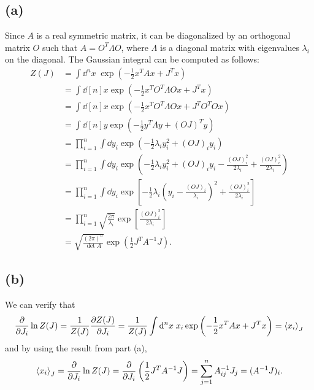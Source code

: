 \documentclass{article}
\begin{document}
\subsection*{(a)}
Since $A$ is a real symmetric matrix, it can be diagonalized by an orthogonal matrix $O$ such that $A=O^T \Lambda O$, where $\Lambda$ is a diagonal matrix with eigenvalues $\lambda_i$ on the diagonal. 
The Gaussian integral can be computed as follows:
\begin{equation}
    \begin{split}
        Z(J) & = \int \dd^n x \; \exp\left(-\frac{1}{2} x^T A x+J^T x\right)\\
             & = \int \dd[n]{x} \exp(-\frac{1}{2}x^T O^T \Lambda Ox+J^T x)\\
             & = \int \dd[n]{x} \exp(-\frac{1}{2}x^T O^T \Lambda Ox+J^T O^T O x)\\
             & = \int \dd[n]{y} \exp(-\frac{1}{2}y^T \Lambda y +(OJ)^T y)\\
             & = \prod_{i=1}^n \int \dd{y_i} \exp\left(-\frac{1}{2}\lambda_i y_i^2 + (OJ)_i y_i\right)\\
             & = \prod_{i=1}^n \int \dd{y_i} \exp(-\frac{1}{2}\lambda_i y_i^2 +(OJ)_i y_i -\frac{(OJ)_i^2}{2\lambda_i} + \frac{(OJ)_i^2}{2\lambda_i})\\
             & = \prod_{i=1}^n \int \dd{y_i} \exp[-\frac{1}{2}\lambda_i \left(y_i - \frac{(OJ)_i}{\lambda_i}\right)^2 + \frac{(OJ)_i^2}{2\lambda_i}]\\
             & = \prod_{i=1}^n \sqrt{\frac{2\pi}{\lambda_i}} \exp[\frac{(OJ)_i^2}{2\lambda_i}]\\
             & = \sqrt{\frac{(2\pi)^n}{\det A}} \exp(\frac{1}{2} J^T A^{-1} J).
    \end{split}
\end{equation}
\subsection*{(b)}
We can verify that 
\begin{equation}
    \pdv{J_i}\ln{Z(J)}=\frac{1}{Z(J)}\pdv{Z(J)}{J_i}=\frac{1}{Z(J)}\int \dd^n x \; x_i \exp\left(-\frac{1}{2} x^T A x+J^T x\right)=\expval{x_i}_J
\end{equation}
and by using the result from part (a),
\begin{equation}
    \expval{x_i}_J = \pdv{J_i}\ln{Z(J)} = \pdv{J_i} \left( \frac{1}{2} J^T A^{-1} J \right) = \sum_{j=1}^n A^{-1}_{ij} J_j=(A^{-1}J)_i.
\end{equation}
\end{document}
